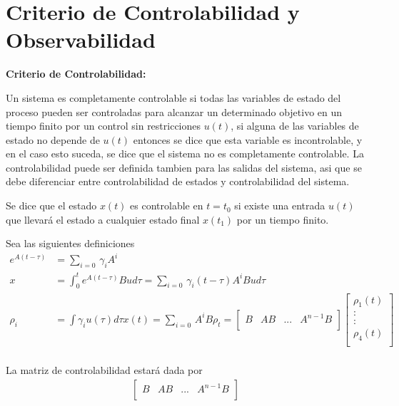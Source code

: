 \documentclass[12pt]{article}
\begin{document}
\section{Criterio de Controlabilidad y Observabilidad}
\textbf{Criterio de Controlabilidad:}
\vspace{5mm}

Un sistema es completamente controlable si todas las variables de estado del proceso pueden ser controladas para alcanzar un determinado objetivo en un tiempo finito por un control sin restricciones $u(t)$, si alguna de las variables de estado no depende de $u(t)$ entonces se dice que esta variable es incontrolable, y en el caso esto suceda, se dice que el sistema no es completamente controlable. La controlabilidad puede ser definida tambien para las salidas del sistema, asi que se debe diferenciar entre controlabilidad de estados y controlabilidad del sistema.

Se dice que el estado $x(t)$ es controlable en $t=t_{0}$ si existe una entrada $u(t)$ que llevará el estado a cualquier estado final $x(t_{1})$ por un tiempo finito.

Sea las siguientes definiciones
\begin{equation}
    \begin{split}
        e^{A(t-\tau)}&=\displaystyle\sum_{i=0}^{}\,\gamma_{i}A^i\\
        x&=\int_{0}^{t}e^{A(t-\tau)}Bu d\tau=\displaystyle\sum_{i=0}^{}\,\gamma_{i}(t-\tau)A^iBu d\tau\\
        \rho_{i}&=\int\gamma_{i}u(\tau)d\tau
        x(t)=\displaystyle\sum_{i=0}^{}\,A^iB\rho_{t}=
        \begin{bmatrix}
            B & AB & ... & A^{n-1}B \\
        \end{bmatrix}
        \begin{bmatrix}
            \rho_{1}(t) \\
            : \\
            : \\
            \rho_{4}(t) \\
        \end{bmatrix}\\
        \label{eq:obs_demos}
    \end{split}
\end{equation}

La matriz de controlabilidad estará dada por 
\begin{equation}
    \begin{split}
        \begin{bmatrix}
            B & AB & ... & A^{n-1}B \\
        \end{bmatrix}
        \label{eq:matriz_control}
    \end{split}
\end{equation}
\end{document}
